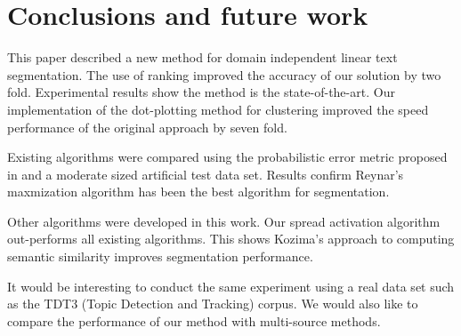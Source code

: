 \documentclass[11pt]{article}
\begin{document}
\section{Conclusions and future work}
This paper described a new method for domain independent linear text segmentation. The use of ranking improved the accuracy of our solution by two fold. Experimental results show the method is the state-of-the-art. Our implementation of the dot-plotting method for clustering improved the speed performance of the original approach by seven fold.

Existing algorithms were compared using the probabilistic error metric proposed in \cite{beeferman_et_al_1999} and a moderate sized artificial test data set. Results confirm Reynar's maxmization algorithm \cite{reynar_1998} has been the best algorithm for segmentation.

Other algorithms were developed in this work. Our spread activation algorithm out-performs all existing algorithms. This shows Kozima's approach \cite{kozima_1993} to computing semantic similarity improves segmentation performance.

It would be interesting to conduct the same experiment using a real data set such as the TDT3 (Topic Detection and Tracking) corpus. We would also like to compare the performance of our method with multi-source methods.



\end{document}
